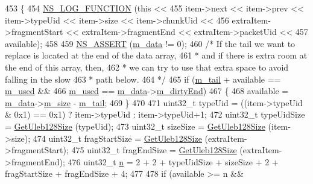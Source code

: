\begin{DoxyCode}
453 \{
454   \hyperlink{log-macros-disabled_8h_a90b90d5bad1f39cb1b64923ea94c0761}{NS\_LOG\_FUNCTION} (\textcolor{keyword}{this} <<
455                    item->next << item->prev << item->typeUid << item->size << item->chunkUid <<
456                    extraItem->fragmentStart << extraItem->fragmentEnd << extraItem->packetUid <<
457                    available);
458 
459   \hyperlink{assert_8h_a6dccdb0de9b252f60088ce281c49d052}{NS\_ASSERT} (\hyperlink{classns3_1_1PacketMetadata_a6a7206086aec2a73a094fe072650b9ee}{m\_data} != 0);
460   \textcolor{comment}{/* If the tail we want to replace is located at the end of the data array,}
461 \textcolor{comment}{   * and if there is extra room at the end of this array, then, }
462 \textcolor{comment}{   * we can try to use that extra space to avoid falling in the slow}
463 \textcolor{comment}{   * path below.}
464 \textcolor{comment}{   */}
465   \textcolor{keywordflow}{if} (\hyperlink{classns3_1_1PacketMetadata_ad24a659e236af7b98c475c97c4f60db9}{m\_tail} + available == \hyperlink{classns3_1_1PacketMetadata_afeecb22fe6f3368f3c56bda755892df9}{m\_used} &&
466       \hyperlink{classns3_1_1PacketMetadata_afeecb22fe6f3368f3c56bda755892df9}{m\_used} == \hyperlink{classns3_1_1PacketMetadata_a6a7206086aec2a73a094fe072650b9ee}{m\_data}->\hyperlink{structns3_1_1PacketMetadata_1_1Data_ae98316cc438fb40663c2f848746d8935}{m\_dirtyEnd})
467     \{
468       available = \hyperlink{classns3_1_1PacketMetadata_a6a7206086aec2a73a094fe072650b9ee}{m\_data}->\hyperlink{structns3_1_1PacketMetadata_1_1Data_a1064e5617aec301dd4f28fb86c105848}{m\_size} - \hyperlink{classns3_1_1PacketMetadata_ad24a659e236af7b98c475c97c4f60db9}{m\_tail};
469     \}
470 
471   uint32\_t typeUid = ((item->typeUid & 0x1) == 0x1) ? item->typeUid : item->typeUid+1;
472   uint32\_t typeUidSize = \hyperlink{classns3_1_1PacketMetadata_a4ea634655d1780a2b4dd9a3ac54c3501}{GetUleb128Size} (typeUid);
473   uint32\_t sizeSize = \hyperlink{classns3_1_1PacketMetadata_a4ea634655d1780a2b4dd9a3ac54c3501}{GetUleb128Size} (item->size);
474   uint32\_t fragStartSize = \hyperlink{classns3_1_1PacketMetadata_a4ea634655d1780a2b4dd9a3ac54c3501}{GetUleb128Size} (extraItem->fragmentStart);
475   uint32\_t fragEndSize = \hyperlink{classns3_1_1PacketMetadata_a4ea634655d1780a2b4dd9a3ac54c3501}{GetUleb128Size} (extraItem->fragmentEnd);
476   uint32\_t \hyperlink{namespacesample-rng-plot_aeb5ee5c431e338ef39b7ac5431242e1d}{n} = 2 + 2 + typeUidSize + sizeSize + 2 + fragStartSize + fragEndSize + 4;
477 
478   \textcolor{keywordflow}{if} (available >= n &&

\end{DoxyCode}
